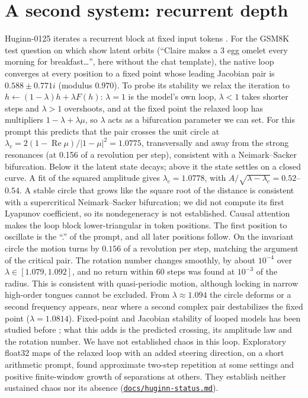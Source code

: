 \documentclass[11pt,letterpaper]{article}
\newcommand{\repourl}{https://github.com/tdj28/neural-shrimp}
\newcommand{\laterrepo}[1]{\href{\repourl/blob/0399fee2e9537a50993482aea8ec417e70286ac4/#1}{\nolinkurl{#1}}}
\begin{document}
\section{A second system: recurrent depth}
\label{sec:huginn}
Huginn-0125 iterates a recurrent block at fixed input tokens \cite{geiping2025recurrent}. For the GSM8K
\cite{cobbe2021gsm8k} test question on which \citet{geiping2025recurrent} show latent orbits (``Claire makes a 3 egg
omelet every morning for breakfast\ldots'', here without the chat template), the native loop converges at every
position to a fixed point whose leading Jacobian pair is $0.588\pm0.771i$ (modulus $0.970$). To probe its stability we relax the iteration to $h\leftarrow(1-\lambda)h+\lambda F(h)$: $\lambda=1$ is the model's own
loop, $\lambda<1$ takes shorter steps and $\lambda>1$ overshoots, and at the fixed point the relaxed loop has
multipliers $1-\lambda+\lambda\mu$, so $\lambda$ acts as a bifurcation parameter we can set. For this prompt this
predicts that the pair crosses the unit circle at
$\lambda_c=2(1-\operatorname{Re}\mu)/|1-\mu|^2=1.0775$, transversally and away from the strong resonances (at
0.156 of a revolution per step), consistent with a Neimark--Sacker bifurcation. Below it the latent state
decays; above it the state settles on a closed curve. A fit of the squared amplitude gives $\lambda_c=1.0778$, with
$A/\sqrt{\lambda-\lambda_c}=0.52$--$0.54$. A stable circle that grows like the square root of the distance is
consistent with a supercritical Neimark--Sacker bifurcation; we did not compute its first Lyapunov coefficient, so its
nondegeneracy is not established. Causal attention makes the loop block lower-triangular in
token positions. The first position to oscillate is the ``.'' of the prompt, and all later positions follow. On the
invariant circle the motion turns by $0.156$ of a revolution per step, matching the argument of the critical pair.
The rotation number changes smoothly, by about $10^{-4}$ over $\lambda\in[1.079,1.092]$, and no return within 60
steps was found at $10^{-3}$ of the radius. This is consistent with quasi-periodic motion, although locking in narrow
high-order tongues cannot be excluded. From $\lambda\approx1.094$ the circle deforms or a second frequency appears,
near where a second complex pair destabilizes the fixed point ($\lambda=1.0814$). Fixed-point and Jacobian stability
of looped models has been studied before \cite{yang2026stars}; what this adds is the predicted crossing, its amplitude
law and the rotation number. We have not established chaos in this loop. Exploratory float32 maps of the relaxed loop
with an added steering direction, on a short arithmetic prompt, found approximate two-step repetition at some
settings and positive finite-window growth of separations at others. They establish neither sustained chaos nor its
absence (\laterrepo{docs/huginn-status.md}).
\end{document}
